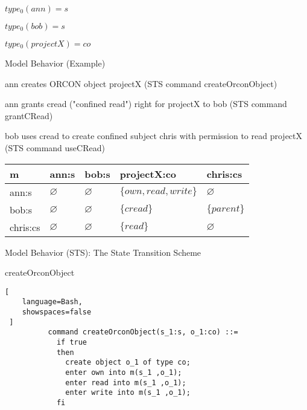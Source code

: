 \documentclass[a4paper]{article}
\begin{document}
\begin{multicols}{3}
\begin{itemize*}
\begin{itemize*}
\begin{itemize*}
                                  \begin{itemize*}
                                      \item $type_0(ann)=s$
                                      \item $type_0(bob)=s$
                                      \item $type_0(projectX)=co$
                                  \end{itemize*}
                        \end{itemize*}
              \end{itemize*}
        \item Model Behavior (Example)
              \begin{itemize*}
                  \item ann creates ORCON object projectX (STS command createOrconObject)
                  \item ann grants cread ("confined read") right for projectX to bob (STS command grantCRead)
                  \item bob uses cread to create confined subject chris with permission to read projectX (STS command useCRead)
              \end{itemize*}
    \end{itemize*}

    \begin{tabular}{l|l|l|l|l}
        m        & ann:s         & bob:s         & projectX:co            & chris:cs      \\\hline
        ann:s    & $\varnothing$ & $\varnothing$ & $\{own, read, write\}$ & $\varnothing$ \\
        bob:s    & $\varnothing$ & $\varnothing$ & $\{cread\}$            & $\{parent\}$  \\
        chris:cs & $\varnothing$ & $\varnothing$ & $\{read\}$             & $\varnothing$
    \end{tabular}

    Model Behavior (STS): The State Transition Scheme
    \begin{itemize*}
        \item createOrconObject
              \begin{lstlisting}[
    language=Bash,
    showspaces=false
 ]
          command createOrconObject(s_1:s, o_1:co) ::=
            if true
            then
              create object o_1 of type co;
              enter own into m(s_1 ,o_1);
              enter read into m(s_1 ,o_1);
              enter write into m(s_1 ,o_1);
            fi
  \end{lstlisting}


\end{itemize*}
\end{multicols}
\end{document}
